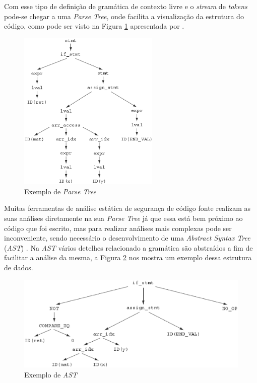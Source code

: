 Com esse tipo de definição de gramática de contexto livre e o \textit{stream}
de \textit{tokens} pode-se chegar a uma \textit{Parse Tree}, onde facilita a
visualização da estrutura do código, como pode ser visto na Figura
\ref{fig:parse_tree} apresentada por .

\begin{figure}[h]
  \centering
  \includegraphics[width=0.6\textwidth]
      {figuras/parse_tree}
      \caption{Exemplo de \textit{Parse Tree} \cite{chess&west2007}}
  \label{fig:parse_tree}
\end{figure}

Muitas ferramentas de análise estática de segurança de código fonte realizam as
suas análises diretamente na sua \textit{Parse Tree} já que essa está bem
próximo ao código que foi escrito, mas para realizar análises mais complexas
pode ser inconveniente, sendo necessário o desenvolvimento de uma
\textit{Abstract Syntax Tree} (\textit{AST}) \cite{chess&west2007}. Na
\textit{AST} vários detelhes relacionado a gramática são abstraídos a fim de
facilitar a análise da mesma, a Figura \ref{fig:ast} nos mostra um exemplo dessa
estrutura de dados.

\begin{figure}[h]
  \centering
  \includegraphics[width=1.0\textwidth]
      {figuras/ast}
      \caption{Exemplo de \textit{AST} \cite{chess&west2007}}
  \label{fig:ast}
\end{figure}

